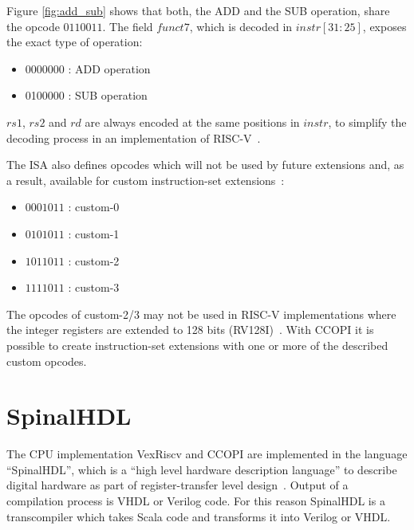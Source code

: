 \documentclass[twoside,twocolumn]{article}
\begin{document}
\noindent Figure \ref*{fig:add_sub} shows that both, the ADD and the SUB
operation, share the opcode $0110011$. The field $funct7$, which is
decoded in $instr[31:25]$, exposes the exact type of operation:
\begin{itemize}
    \item 0000000 : ADD operation
    \item 0100000 : SUB operation
\end{itemize}
$rs1$, $rs2$ and $rd$ are always encoded at the same positions
in $instr$, to simplify the decoding process in an implementation of
RISC-V~\cite[p. 11]{riscv}.

The ISA also defines opcodes which will not be used by future extensions
and, as a result, available for custom instruction-set extensions~\cite[p.
103]{riscv}:
    \begin{itemize}
        \item $0001011$ : custom-0
        \item $0101011$ : custom-1
        \item $1011011$ : custom-2
        \item $1111011$ : custom-3
    \end{itemize}
The opcodes of custom-2/3 may not be used in RISC-V implementations where the
integer registers are extended to 128 bits (RV128I)~\cite[p. 103]{riscv}. With CCOPI it is
possible to create instruction-set extensions with one or more of the described 
custom opcodes.
\section{SpinalHDL}
The CPU implementation VexRiscv and CCOPI are implemented in the
language ``SpinalHDL'', which is a ``high level hardware description
language'' to describe digital hardware as part of register-transfer
level design~\cite{spinal_doc1}. Output of a compilation process is VHDL or
Verilog code. For this reason SpinalHDL is a transcompiler which takes
Scala code and transforms it into Verilog or VHDL.  
\end{document}
